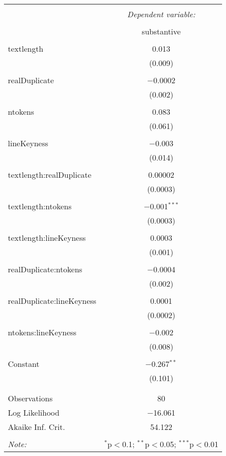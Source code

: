 
\begin{table}[!htbp] \centering 
  \caption{} 
  \label{} 
\begin{tabular}{@{\extracolsep{5pt}}lc} 
\\[-1.8ex]\hline 
\hline \\[-1.8ex] 
 & \multicolumn{1}{c}{\textit{Dependent variable:}} \\ 
\cline{2-2} 
\\[-1.8ex] & substantive \\ 
\hline \\[-1.8ex] 
 textlength & 0.013 \\ 
  & (0.009) \\ 
  & \\ 
 realDuplicate & $-$0.0002 \\ 
  & (0.002) \\ 
  & \\ 
 ntokens & 0.083 \\ 
  & (0.061) \\ 
  & \\ 
 lineKeyness & $-$0.003 \\ 
  & (0.014) \\ 
  & \\ 
 textlength:realDuplicate & 0.00002 \\ 
  & (0.0003) \\ 
  & \\ 
 textlength:ntokens & $-$0.001$^{***}$ \\ 
  & (0.0003) \\ 
  & \\ 
 textlength:lineKeyness & 0.0003 \\ 
  & (0.001) \\ 
  & \\ 
 realDuplicate:ntokens & $-$0.0004 \\ 
  & (0.002) \\ 
  & \\ 
 realDuplicate:lineKeyness & 0.0001 \\ 
  & (0.0002) \\ 
  & \\ 
 ntokens:lineKeyness & $-$0.002 \\ 
  & (0.008) \\ 
  & \\ 
 Constant & $-$0.267$^{**}$ \\ 
  & (0.101) \\ 
  & \\ 
\hline \\[-1.8ex] 
Observations & 80 \\ 
Log Likelihood & $-$16.061 \\ 
Akaike Inf. Crit. & 54.122 \\ 
\hline 
\hline \\[-1.8ex] 
\textit{Note:}  & \multicolumn{1}{r}{$^{*}$p$<$0.1; $^{**}$p$<$0.05; $^{***}$p$<$0.01} \\ 
\end{tabular} 
\end{table} 
